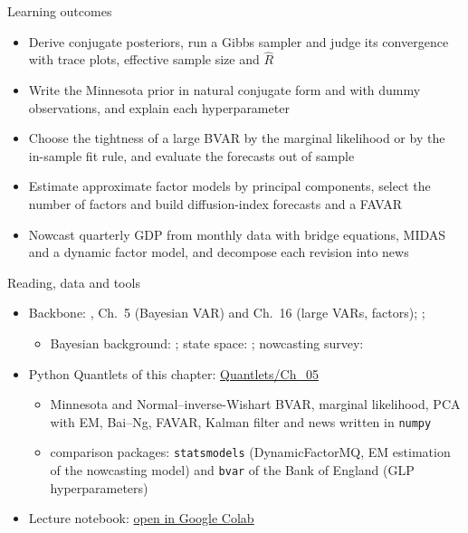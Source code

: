 \begin{frame}{Learning outcomes}
\itemsize{\small}
\begin{itemize}
    \item Derive conjugate posteriors, run a Gibbs sampler and judge its convergence with trace plots, effective sample size and $\widehat R$
    \item Write the Minnesota prior in natural conjugate form and with dummy observations, and explain each hyperparameter
    \item Choose the tightness of a large BVAR by the marginal likelihood or by the in-sample fit rule, and evaluate the forecasts out of sample
    \item Estimate approximate factor models by principal components, select the number of factors and build diffusion-index forecasts and a FAVAR
    \item Nowcast quarterly GDP from monthly data with bridge equations, MIDAS and a dynamic factor model, and decompose each revision into news
\end{itemize}
\end{frame}

\begin{frame}{Reading, data and tools}
\itemsize{\small}
\begin{itemize}
    \item Backbone: , Ch.~5 (Bayesian VAR) and Ch.~16 (large VARs, factors); ; 
    \begin{itemize}
        \item Bayesian background: ; state space: ; nowcasting survey: 
    \end{itemize}
    \item Python Quantlets of this chapter: \href{https://github.com/danpele/Advanced-Time-Series/tree/main/Quantlets/Ch_05}{Quantlets/Ch\_05}
    \begin{itemize}
        \item Minnesota and Normal--inverse-Wishart BVAR, marginal likelihood, PCA with EM, Bai--Ng, FAVAR, Kalman filter and news written in \texttt{numpy}
        \item comparison packages: \texttt{statsmodels} (DynamicFactorMQ, EM estimation of the nowcasting model) and \texttt{bvar} of the Bank of England (GLP hyperparameters)
    \end{itemize}
    \item Lecture notebook: \href{\colaburl{notebooks/EN/chapter5_lecture_notebook.ipynb}}{open in Google Colab}
\end{itemize}
\end{frame}

